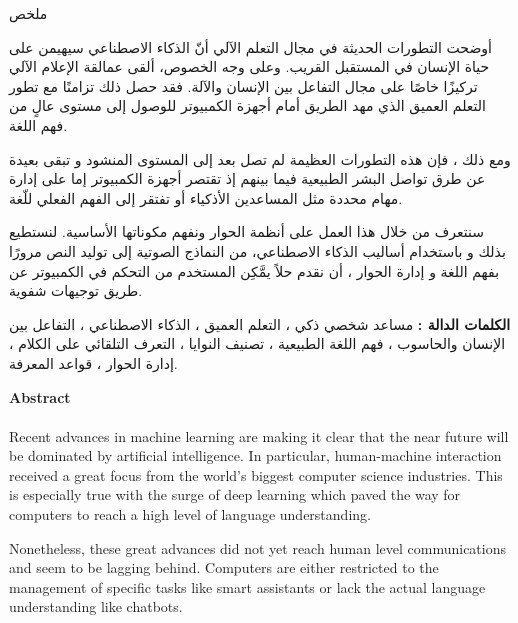 \begin{center}
    \Large 
    \begin{arab}
    ملخص
    \end{arab}
\end{center}
\begin{arab}
	أوضحت التطورات الحديثة في مجال التعلم الآلي أنّ الذكاء الاصطناعي سيهيمن على حياة الإنسان في المستقبل القريب. وعلى وجه الخصوص، ألقى عمالقة الإعلام الآلي تركيزًا خاصًا على مجال التفاعل بين الإنسان والآلة. فقد حصل ذلك تزامنًا مع تطور التعلم العميق الذي مهد الطريق أمام أجهزة الكمبيوتر للوصول إلى مستوى عالٍ من فهم اللغة.
	
	ومع ذلك ، فإن هذه التطورات العظيمة لم تصل بعد إلى المستوى المنشود و تبقى بعيدة عن طرق تواصل البشر الطبيعية فيما بينهم إذ تقتصر أجهزة الكمبيوتر إما على إدارة مهام محددة مثل المساعدين الأذكياء أو تفتقر إلى الفهم الفعلي للّغة.
	
	سنتعرف من خلال هذا العمل على أنظمة الحوار ونفهم مكوناتها الأساسية. لنستطيع بذلك و باستخدام أساليب الذكاء الاصطناعي، من النماذج الصوتية إلى توليد النص مرورًا بفهم اللغة و إدارة الحوار ، أن نقدم حلاً  يمَّكِن المستخدم من التحكم في الكمبيوتر عن طريق توجيهات شفوية.
\par 
\textbf{الكلمات الدالة :} مساعد شخصي ذكي ، التعلم العميق ، الذكاء الاصطناعي ، التفاعل بين الإنسان والحاسوب ، فهم اللغة الطبيعية ، تصنيف النوايا ، التعرف التلقائي على الكلام ، إدارة الحوار ، قواعد المعرفة.
\end{arab}

\vspace*{0.8cm}

\newpage
\clearpage
\begin{center}
    \Large 
    \textbf{Abstract}
\end{center}

\paragraph{}
Recent advances in machine learning are making it clear that the near future will be dominated by artificial intelligence. In particular, human-machine interaction received a great focus from the world's biggest computer science industries. This is especially true with the surge of deep learning which paved the way for computers to reach a high level of language understanding.

Nonetheless, these great advances did not yet reach human level communications and seem to be lagging behind. Computers are either restricted to the management of specific tasks like smart assistants or lack the actual language understanding like chatbots.

